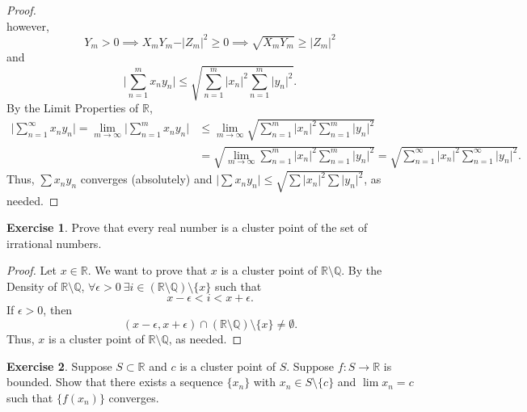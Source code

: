 \documentclass[12pt]{article}
\theoremstyle{definition}
\newtheorem{exercise}{Exercise}
\begin{document}
\begin{proof}
\[    \]
    however, 
    \[
        Y_m > 0 \implies X_mY_m - \vert Z_m \vert^2 \geq 0 \implies \sqrt{X_mY_m} \geq \vert Z_m \vert^2
    \]
    and
    \[
        \bigg\vert \sum_{n = 1}^{m}x_ny_n \bigg\vert \leq \sqrt{\sum_{n = 1}^{m}\vert x_n \vert^2\sum_{n = 1}^{m}\vert y_n \vert^2}.  
    \]
    By the Limit Properties of \(\mathbb{R}\),
    \begin{align*}
        \bigg\vert \sum_{n = 1}^{\infty}x_ny_n \bigg\vert = \lim_{m \to \infty}\bigg\vert \sum_{n = 1}^{m}x_ny_n \bigg\vert &\leq \lim_{m \to \infty}\sqrt{\sum_{n = 1}^{m}\vert x_n \vert^2\sum_{n = 1}^{m}\vert y_n \vert^2} \\
        &= \sqrt{\lim_{m \to \infty}\sum_{n = 1}^{m}\vert x_n \vert^2\sum_{n = 1}^{m}\vert y_n \vert^2} = \sqrt{\sum_{n = 1}^{\infty}\vert x_n \vert^2\sum_{n = 1}^{\infty}\vert y_n \vert^2}.
    \end{align*}
    Thus, \(\sum x_ny_n\) converges (absolutely) and \(\vert \sum x_ny_n \vert \leq \sqrt{\sum \vert x_n \vert^2 \sum \vert y_n \vert^2}\), as needed.
\end{proof}

\begin{exercise}
    Prove that every real number is a cluster point of the set of irrational numbers.
\end{exercise}

\begin{proof}
    Let \(x \in \mathbb{R}\). We want to prove that \(x\) is a cluster point of \(\mathbb{R} \setminus \mathbb{Q}\). By the Density of \(\mathbb{R} \setminus \mathbb{Q}\), \(\forall \epsilon > 0 \ \exists i \in (\mathbb{R} \setminus \mathbb{Q}) \setminus \{x\}\) such that 
    \[
        x - \epsilon < i < x + \epsilon.
    \]
    If \(\epsilon > 0\), then
    \[
        (x - \epsilon, x + \epsilon) \cap (\mathbb{R} \setminus \mathbb{Q}) \setminus \{x\} \neq \emptyset.
    \]
    Thus, \(x\) is a cluster point of \(\mathbb{R} \setminus \mathbb{Q}\), as needed.
\end{proof}

\begin{exercise}
    Suppose \(S \subset \mathbb{R}\) and \(c\) is a cluster point of \(S\). Suppose \(f : S \to \mathbb{R}\) is bounded. Show that there exists a sequence \(\{x_n\}\) with \(x_n \in S \setminus \{c\}\) and \(\lim x_n = c\) such that \(\{f(x_n)\}\) converges.
\end{exercise}
\end{document}
